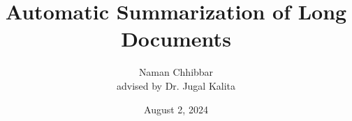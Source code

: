 \documentclass{beamer}
\title{Automatic Summarization of Long Documents}
\author[Naman Chhibbar]{
  Naman Chhibbar \\
  \scriptsize advised by Dr. Jugal Kalita
}
\institute{University of Colorado, Colorado Springs}
\date{August 2, 2024}
\begin{document}
\begin{frame}
  \titlepage
\end{frame}









\end{document}
